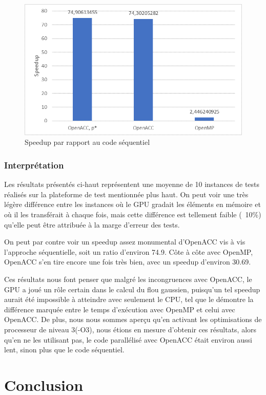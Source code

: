 \documentclass[11pt]{report}
\begin{document}
		\begin{figure}[H]
			\centering
			\includegraphics[scale=0.8]{images/graph_speedup}
			\caption{Speedup par rapport au code séquentiel}
		\end{figure}
		
		\subsection{Interprétation}
			Les résultats présentés ci-haut représentent une moyenne de 10 instances de tests réalisés sur la plateforme de test mentionnée plus haut. On peut voir une très légère différence entre les instances où le GPU gradait les éléments en mémoire et où il les transférait à chaque fois, mais cette différence est tellement faible (~10\%) qu'elle peut être attribuée à la marge d'erreur des tests.

			On peut par contre voir un speedup assez monumental d'OpenACC vis à vis l'approche séquentielle, soit un ratio d'environ 74.9. Côte à côte avec OpenMP, OpenACC s'en tire encore une fois très bien, avec un speedup d'environ 30.69.

			Ces résultats nous font penser que malgré les incongruences avec OpenACC, le GPU a joué un rôle certain dans le calcul du flou gaussien, puisqu'un tel speedup aurait été impossible à atteindre avec seulement le CPU, tel que le démontre la différence marquée entre le temps d'exécution avec OpenMP et celui avec OpenACC. De plus, nous nous sommes aperçu qu'en activant les optimisations de processeur de niveau 3(-O3), nous étions en mesure d'obtenir ces résultats, alors qu'en ne les utilisant pas, le code parallélisé avec OpenACC était environ aussi lent, sinon plus que le code séquentiel.
			

\chapter{Conclusion}
\end{document}
